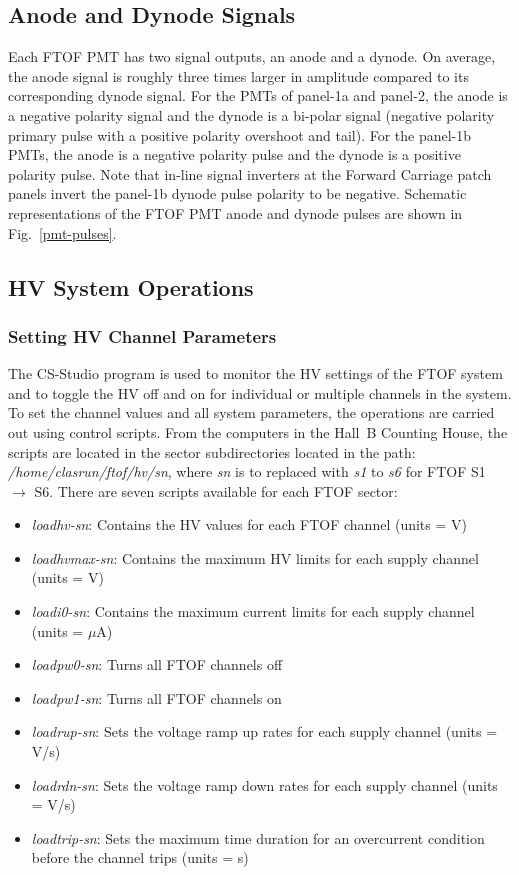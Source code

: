 \documentclass[12pt]{article}
\begin{document}
\subsection{Anode and Dynode Signals}
\label{pmt-signals}

Each FTOF PMT has two signal outputs, an anode and a dynode. On average, the anode signal is 
roughly three times larger in amplitude compared to its corresponding dynode signal. For the 
PMTs of panel-1a and panel-2, the anode is a negative polarity signal and the dynode is a 
bi-polar signal (negative polarity primary pulse with a positive polarity overshoot and tail). 
For the panel-1b PMTs, the anode is a negative polarity pulse and the dynode is a positive 
polarity pulse. Note that in-line signal inverters at the Forward Carriage patch panels invert
the panel-1b dynode pulse polarity to be negative. Schematic representations of the FTOF PMT 
anode and dynode pulses are shown in Fig.~\ref{pmt-pulses}.

\subsection{HV System Operations}

\subsubsection{Setting HV Channel Parameters}
\label{hv-parms}

The CS-Studio program is used to monitor the HV settings of the FTOF system and to toggle the HV 
off and on for individual or multiple channels in the system. To set the channel values and all 
system parameters, the operations are carried out using control scripts. From the computers in the 
Hall~B Counting House, the scripts are located in the sector subdirectories located in the path: 
{\it /home/clasrun/ftof/hv/sn}, where {\it sn} is to replaced with {\it s1} to {\it s6} for FTOF 
S1 $\to$ S6. There are seven scripts available for each FTOF sector:

\begin{itemize}
\item {\it loadhv-sn}: Contains the HV values for each FTOF channel (units = V)
\item {\it loadhvmax-sn}: Contains the maximum HV limits for each supply channel (units = V)
\item {\it loadi0-sn}: Contains the maximum current limits for each supply channel (units = $\mu$A)
\item {\it loadpw0-sn}: Turns all FTOF channels off
\item {\it loadpw1-sn}: Turns all FTOF channels on
\item {\it loadrup-sn}: Sets the voltage ramp up rates for each supply channel (units = V/s)
\item {\it loadrdn-sn}: Sets the voltage ramp down rates for each supply channel (units = V/s)
\item {\it loadtrip-sn}: Sets the maximum time duration for an overcurrent condition before the 
channel trips (units = s)
\end{itemize}
\end{document}
